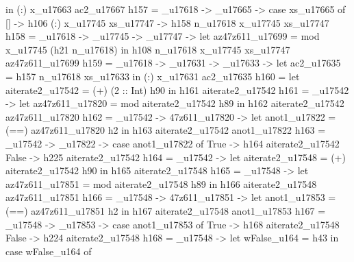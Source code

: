                                                         in (:) x_u17663 ac2_u17667
         h157 = \n_u17618 -> \xs_u17665 -> case xs_u17665 of
                                             [] -> h106
                                             (:) x_u17745 xs_u17747 -> h158 n_u17618 x_u17745 xs_u17747
         h158 = \n_u17618 -> \x_u17745 -> \xs_u17747 -> let
                                                          az47z611_u17699 = mod x_u17745 (h21 n_u17618)
                                                        in h108 n_u17618 x_u17745 xs_u17747 az47z611_u17699
         h159 = \n_u17618 -> \x_u17631 -> \xs_u17633 -> let
                                                          ac2_u17635 = h157 n_u17618 xs_u17633
                                                        in (:) x_u17631 ac2_u17635
         h160 = let aiterate2_u17542 = (+) (2 :: Int) h90
                in h161 aiterate2_u17542
         h161 = _u17542 -> let
                                       az47z611_u17820 = mod aiterate2_u17542 h89
                                     in h162 aiterate2_u17542 az47z611_u17820
         h162 = _u17542 -> \az47z611_u17820 -> let
                                                           anot1_u17822 = (==) az47z611_u17820 h2
                                                         in h163 aiterate2_u17542 anot1_u17822
         h163 = _u17542 -> _u17822 -> case anot1_u17822 of
                                                        True -> h164 aiterate2_u17542
                                                        False -> h225 aiterate2_u17542
         h164 = _u17542 -> let
                                       aiterate2_u17548 = (+) aiterate2_u17542 h90
                                     in h165 aiterate2_u17548
         h165 = _u17548 -> let
                                       az47z611_u17851 = mod aiterate2_u17548 h89
                                     in h166 aiterate2_u17548 az47z611_u17851
         h166 = _u17548 -> \az47z611_u17851 -> let
                                                           anot1_u17853 = (==) az47z611_u17851 h2
                                                         in h167 aiterate2_u17548 anot1_u17853
         h167 = _u17548 -> _u17853 -> case anot1_u17853 of
                                                        True -> h168 aiterate2_u17548
                                                        False -> h224 aiterate2_u17548
         h168 = _u17548 -> let wFalse_u164 = h43
                                     in case wFalse_u164 of
